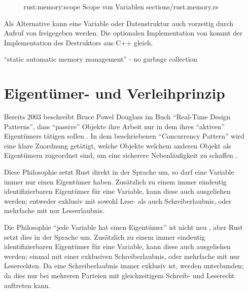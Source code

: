 \begin{figure}[H]
	\rustcinclude
		{rust:memory:scope}
		{Scope von Variablen}
		{sections/rust.memory.rs}
\end{figure}

Als Alternative kann eine Variable oder Datenstruktur auch vorzeitig durch Aufruf von  freigegeben werden.
Die optionalen Implementation von   kommt der Implementation des Destruktors aus C++ gleich.

\enquote{static automatic memory management} - no garbage collection \cite{rust:youtube:goto2017}
 \\



\section{Eigentümer- und Verleihprinzip}
\label{rust:ownership}

Bereits 2003 beschreibt Bruce Powel Douglass im Buch \enquote{Real-Time Design Patterns}, dass \enquote{passive} Objekte ihre Arbeit nur in dem  ihres \enquote{aktiven} Eigentümers tätigen sollen \cite[204]{douglass2003real}.
In dem beschriebenen \enquote{Concurrency Pattern} wird eine klare Zuordnung getätigt, welche Objekte welchem anderen Objekt als Eigentümern zugeordnet sind, um eine sicherere Nebenläufigkeit zu schaffen .

Diese Philosophie setzt Rust direkt in der Sprache um, so darf eine Variable immer nur einen Eigentümer haben. Zusätzlich zu einem immer eindeutig identifizierbaren Eigentümer für eine Variable, kann diese auch ausgeliehen werden; entweder exklusiv mit sowohl Lese- als auch Schreiberlaubnis, oder mehrfache mit nur Leseerlaubnis.

Die Philosophie \enquote{jede Variable hat einen Eigentümer} ist nicht neu 
 , aber Rust setzt dies in der Sprache um.
Zusätzlich zu einem immer eindeutig identifizierbaren Eigentümer für eine Variable, kann diese auch ausgeliehen werden; einmal mit einer exklusiven Schreiberlaubnis, oder mehrfache mit nur Leserechten.
Da eine Schreiberlaubnis immer exklusiv ist, werden  unterbunden; da dies nur bei mehreren Parteien mit gleichzeitigem Schreib- und Leserecht auftreten kann.

